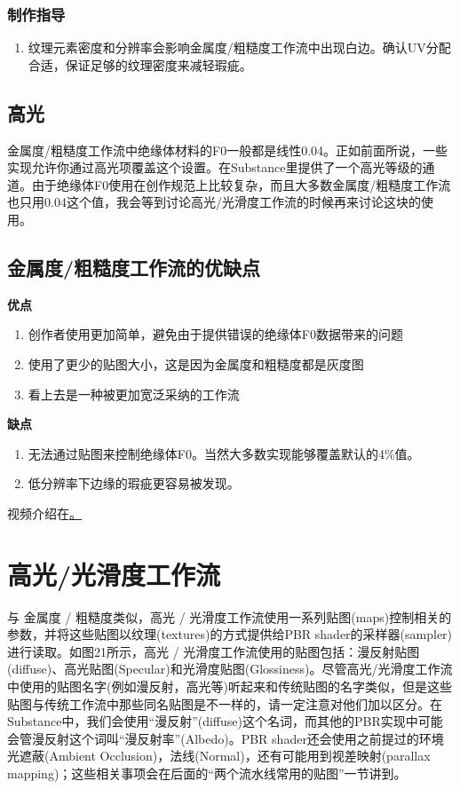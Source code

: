 \subsubsection{制作指导}

\begin{enumerate}
\item 纹理元素密度和分辨率会影响金属度/粗糙度工作流中出现白边。确认UV分配合适，保证足够的纹理密度来减轻瑕疵。
\end{enumerate}

\subsection{高光}

金属度/粗糙度工作流中绝缘体材料的F0一般都是线性0.04。正如前面所说，一些实现允许你通过高光项覆盖这个设置。在Substance里提供了一个高光等级的通道。由于绝缘体F0使用在创作规范上比较复杂，而且大多数金属度/粗糙度工作流也只用0.04这个值，我会等到讨论高光/光滑度工作流的时候再来讨论这块的使用。

\subsection{金属度/粗糙度工作流的优缺点}

\textbf{优点}

\begin{enumerate}
\item 创作者使用更加简单，避免由于提供错误的绝缘体F0数据带来的问题
\item 使用了更少的贴图大小，这是因为金属度和粗糙度都是灰度图
\item 看上去是一种被更加宽泛采纳的工作流
\end{enumerate}

\textbf{缺点}

\begin{enumerate}
\item 无法通过贴图来控制绝缘体F0。当然大多数实现能够覆盖默认的4\%值。
\item 低分辨率下边缘的瑕疵更容易被发现。
\end{enumerate}

视频介绍在\href{http://www.allegorithmic.com/pbr-guide}。

\section{高光/光滑度工作流}

与 金属度 / 粗糙度类似，高光 / 光滑度工作流使用一系列贴图(maps)控制相关的参数，并将这些贴图以纹理(textures)的方式提供给PBR shader的采样器(sampler)进行读取。如图21所示，高光 / 光滑度工作流使用的贴图包括：漫反射贴图(diffuse)、高光贴图(Specular)和光滑度贴图(Glossiness)。尽管高光/光滑度工作流中使用的贴图名字(例如漫反射，高光等)听起来和传统贴图的名字类似，但是这些贴图与传统工作流中那些同名贴图是不一样的，请一定注意对他们加以区分。在Substance中，我们会使用“漫反射”(diffuse)这个名词，而其他的PBR实现中可能会管漫反射这个词叫“漫反射率”(Albedo)。PBR shader还会使用之前提过的环境光遮蔽(Ambient Occlusion)，法线(Normal)，还有可能用到视差映射(parallax mapping)；这些相关事项会在后面的“两个流水线常用的贴图”一节讲到。

